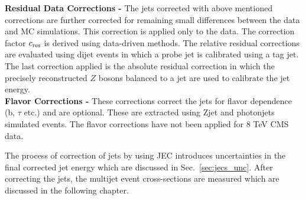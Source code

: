 {\bf Residual Data Corrections -} The jets corrected with above mentioned corrections are further corrected for remaining small differences between the data and MC simulations. This correction is applied only to the data. The correction factor $c_{\rm res}$ is derived using data-driven methods. The relative residual corrections are evaluated using dijet events in which a probe jet is calibrated using a tag jet. The last correction applied is the absolute residual correction in which the precisely reconstructed $Z$ bosons balanced to a jet are used to calibrate the jet energy. \\ \newline
{\bf Flavor Corrections -} These corrections correct the jets for flavor dependence (b, $\tau$ etc.) and are optional. These are extracted using Z\plusn jet and photon\plusn jets simulated events. The flavor corrections have not been applied for 8 TeV CMS data.

The process of correction of jets by using JEC introduces uncertainties in the final corrected jet energy which are discussed in Sec.~\ref{sec:jecs_unc}. After correcting the jets, the multijet event cross-sections are measured which are discussed in the following chapter.
